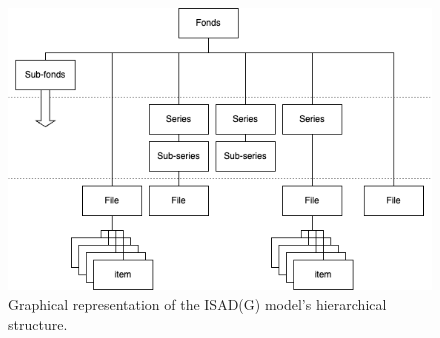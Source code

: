 \begin{figure}[!h]
    \centering
    \includegraphics[width=\linewidth]{chapters/3-mdc_model-reactivation_workflow-instruction_template/image/graph03-isadg.png}
    \caption{Graphical representation of the ISAD(G) model’s hierarchical structure.}
    \label{fig:c3-isadg}
\end{figure} 

